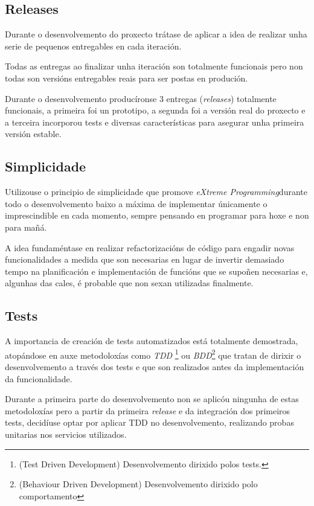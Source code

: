     \subsection{Releases}
    Durante o desenvolvemento do proxecto trátase de aplicar a idea de realizar 
unha serie de pequenos entregables en cada iteración.

    Todas as entregas ao finalizar unha iteración son totalmente funcionais 
pero non todas son versións entregables reais para ser postas en produción.

    Durante o desenvolvemento producíronse 3 entregas (\emph{releases}) 
totalmente funcionais, a primeira foi un prototipo, a segunda foi a versión 
real do proxecto e a terceira incorporou tests e diversas características para 
asegurar unha primeira versión estable.

    \subsection{Simplicidade}
    Utilizouse o principio de simplicidade que promove \emph{eXtreme 
Programming}durante todo o desenvolvemento baixo a máxima de implementar 
únicamente o imprescindible en cada momento, sempre pensando en programar 
para hoxe e non para mañá.

    A idea fundaméntase en realizar refactorizacións de código para engadir 
novas funcionalidades a medida que son necesarias en lugar de invertir 
demasiado tempo na planificación e implementación de funcións que se supoñen 
necesarias e, algunhas das cales, é probable que non sexan utilizadas
finalmente.

    \subsection{Tests}
    A importancia de creación de tests automatizados está totalmente 
demostrada, atopándose en auxe metodoloxías como \emph{TDD} \footnote{(Test 
Driven Development) Desenvolvemento dirixido polos tests.} ou 
\emph{BDD}\footnote{(Behaviour Driven Development) Desenvolvemento dirixido 
polo comportamento} que tratan de dirixir o desenvolvemento a través dos tests e
que son realizados antes da implementación da funcionalidade.

    Durante a primeira parte do desenvolvemento non se aplicóu ningunha de 
estas metodoloxías pero a partir da primeira \emph{release} e da integración 
dos primeiros tests, decidíuse optar por aplicar TDD no desenvolvemento, 
realizando probas unitarias nos servicios utilizados.

